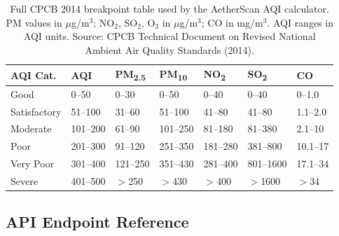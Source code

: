 \documentclass[12pt,a4paper]{article}
\begin{document}
\begin{table}[H]
\centering
\caption[Complete CPCB AQI breakpoint table for all six pollutants]{%
Full CPCB 2014 breakpoint table used by the AetherScan AQI calculator.
PM values in $\mu$g/m$^3$; NO$_2$, SO$_2$, O$_3$ in $\mu$g/m$^3$;
CO in mg/m$^3$. AQI ranges in AQI units. Source: CPCB Technical
Document on Revised National Ambient Air Quality Standards (2014).}
\label{tab:fullbreaks}
\begin{tabularx}{\textwidth}{@{}lXXXXXX@{}}
\toprule
\textbf{AQI Cat.} & \textbf{AQI}
  & \textbf{PM\textsubscript{2.5}} & \textbf{PM\textsubscript{10}}
  & \textbf{NO\textsubscript{2}} & \textbf{SO\textsubscript{2}}
  & \textbf{CO} \\
\midrule
Good        & 0--50   & 0--30    & 0--50    & 0--40    & 0--40    & 0--1.0   \\
Satisfactory& 51--100 & 31--60   & 51--100  & 41--80   & 41--80   & 1.1--2.0 \\
Moderate    & 101--200& 61--90   & 101--250 & 81--180  & 81--380  & 2.1--10  \\
Poor        & 201--300& 91--120  & 251--350 & 181--280 & 381--800 & 10.1--17 \\
Very Poor   & 301--400& 121--250 & 351--430 & 281--400 & 801--1600& 17.1--34 \\
Severe      & 401--500& $>$250   & $>$430   & $>$400   & $>$1600  & $>$34    \\
\bottomrule
\end{tabularx}
\end{table}

\subsection{API Endpoint Reference}
\label{app:tables:api}
\end{document}
